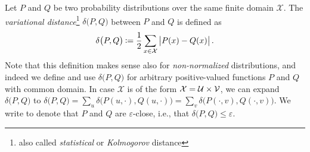 \documentclass[final,11pt,a4paper]{report}
\newcommand*{\q}{\hspace{0.2ex}}
\newcommand*{\assign}{\ensuremath{\kern.5ex\raisebox{.1ex}{\mbox{\rm:}}\kern -.3em =}}
\def\={\hspace{-0.5ex}=\hspace{-0.4ex}}
\newcommand*{\cX}{\mathcal{X}}
\newcommand*{\dist}[1]{\delta\big(#1\big)}  %
\newcommand*{\epsclose}{\approx_{\varepsilon}}
\newcommand*{\E}{\mathbb{E}}   %
\begin{document}
Let $P$ and $Q$ be two probability distributions over the same finite
domain $\cX$. The {\em {}variational distance}\footnote{also called
\emph{statistical} or \emph{Kolmogorov} distance} $\dist{P,Q}$ between $P$ and $Q$
is defined as $$\dist{P,Q} \assign \frac{1}{2} \sum_{x \in \cX}
\big|P(x)-Q(x)\big| \, .$$  Note that this definition makes sense also for
{\em non-normalized} distributions, and indeed we define and use
$\dist{P,Q}$ for arbitrary positive-valued functions $P$ and $Q$ with
common domain.  In case $\cX$ is of the form $\cX = {\cal U} \times
{\cal V}$, we can expand $\dist{P,Q}$ to $\dist{P,Q} = \sum_u
\dist{P(u,\cdot),Q(u,\cdot)} = \sum_v \dist{P(\cdot,v),Q(\cdot,v)}$.
We write \smash{$P \epsclose Q$} to denote that $P$ and $Q$ are
$\varepsilon$-close, i.e., that $\dist{P,Q} \leq \varepsilon$.

\end{document}
